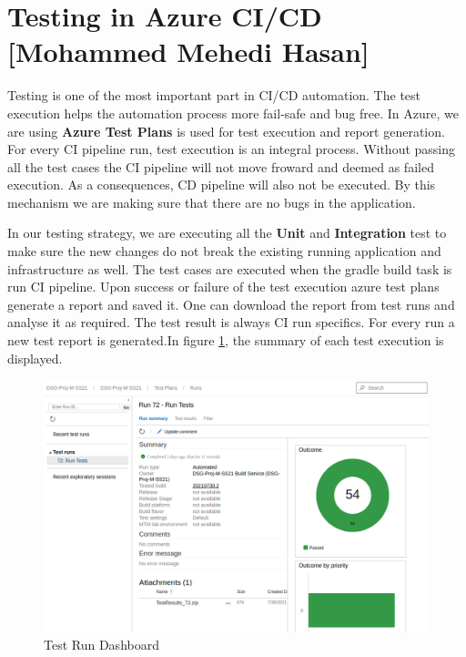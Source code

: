 \section{Testing in Azure CI/CD [Mohammed Mehedi Hasan]}

Testing is one of the most important part in CI/CD automation. The test execution helps the automation process more fail-safe and bug free. In Azure, we are using \textbf{Azure Test Plans} is used for test execution and report generation. For every CI pipeline run, test execution is an integral process. Without passing all the test cases the CI pipeline will not move froward and deemed as failed execution. As a consequences, CD pipeline will also not be executed. By this mechanism we are making sure that there are no bugs in the application.

In our testing strategy, we are executing all the \textbf{Unit} and \textbf{Integration} test to make sure the new changes do not break the existing running application and infrastructure as well. The test cases are executed when the gradle build task is run CI pipeline. Upon success or failure of the test execution azure test plans generate a report and saved it. One can download the report from test runs and analyse it as required. The test result is always CI run specifics. For every run a new test report is generated.In figure \ref{fig:test_run_dashboard}, the summary of each test execution is displayed.

\begin{figure}[h]
\includegraphics[scale=0.40]{images/mehedi/testReportDashboard.png}
\centering
\caption{Test Run Dashboard}
\label{fig:test_run_dashboard}
\end{figure}

